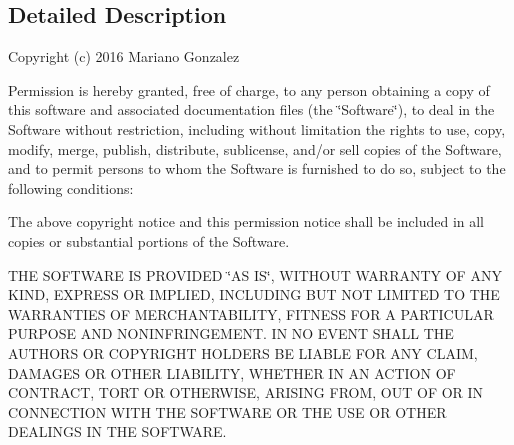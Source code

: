\subsection{Detailed Description}
Copyright (c) 2016 Mariano Gonzalez

Permission is hereby granted, free of charge, to any person obtaining a copy of this software and associated documentation files (the \char`\"{}\+Software\char`\"{}), to deal in the Software without restriction, including without limitation the rights to use, copy, modify, merge, publish, distribute, sublicense, and/or sell copies of the Software, and to permit persons to whom the Software is furnished to do so, subject to the following conditions\+:

The above copyright notice and this permission notice shall be included in all copies or substantial portions of the Software.

T\+HE S\+O\+F\+T\+W\+A\+RE IS P\+R\+O\+V\+I\+D\+ED \char`\"{}\+A\+S I\+S\char`\"{}, W\+I\+T\+H\+O\+UT W\+A\+R\+R\+A\+N\+TY OF A\+NY K\+I\+ND, E\+X\+P\+R\+E\+SS OR I\+M\+P\+L\+I\+ED, I\+N\+C\+L\+U\+D\+I\+NG B\+UT N\+OT L\+I\+M\+I\+T\+ED TO T\+HE W\+A\+R\+R\+A\+N\+T\+I\+ES OF M\+E\+R\+C\+H\+A\+N\+T\+A\+B\+I\+L\+I\+TY, F\+I\+T\+N\+E\+SS F\+OR A P\+A\+R\+T\+I\+C\+U\+L\+AR P\+U\+R\+P\+O\+SE A\+ND N\+O\+N\+I\+N\+F\+R\+I\+N\+G\+E\+M\+E\+NT. IN NO E\+V\+E\+NT S\+H\+A\+LL T\+HE A\+U\+T\+H\+O\+RS OR C\+O\+P\+Y\+R\+I\+G\+HT H\+O\+L\+D\+E\+RS BE L\+I\+A\+B\+LE F\+OR A\+NY C\+L\+A\+IM, D\+A\+M\+A\+G\+ES OR O\+T\+H\+ER L\+I\+A\+B\+I\+L\+I\+TY, W\+H\+E\+T\+H\+ER IN AN A\+C\+T\+I\+ON OF C\+O\+N\+T\+R\+A\+CT, T\+O\+RT OR O\+T\+H\+E\+R\+W\+I\+SE, A\+R\+I\+S\+I\+NG F\+R\+OM, O\+UT OF OR IN C\+O\+N\+N\+E\+C\+T\+I\+ON W\+I\+TH T\+HE S\+O\+F\+T\+W\+A\+RE OR T\+HE U\+SE OR O\+T\+H\+ER D\+E\+A\+L\+I\+N\+GS IN T\+HE S\+O\+F\+T\+W\+A\+RE. 